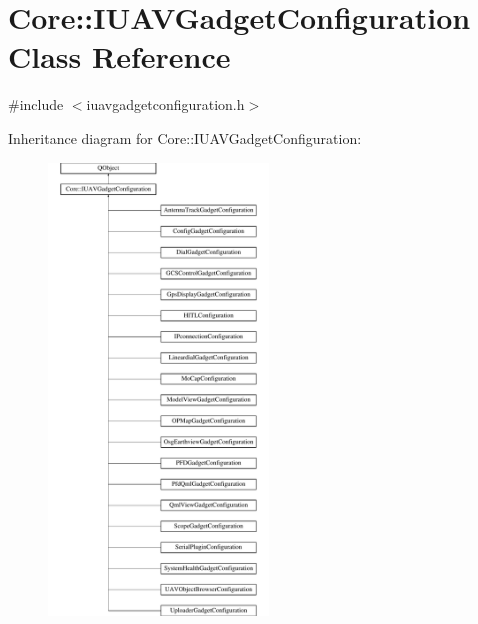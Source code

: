 \hypertarget{class_core_1_1_i_u_a_v_gadget_configuration}{\section{Core\-:\-:I\-U\-A\-V\-Gadget\-Configuration Class Reference}
\label{class_core_1_1_i_u_a_v_gadget_configuration}
}


{\ttfamily \#include $<$iuavgadgetconfiguration.\-h$>$}

Inheritance diagram for Core\-:\-:I\-U\-A\-V\-Gadget\-Configuration\-:\begin{figure}[H]
\begin{center}
\leavevmode
\includegraphics[height=12.000000cm]{class_core_1_1_i_u_a_v_gadget_configuration}
\end{center}
\end{figure}
